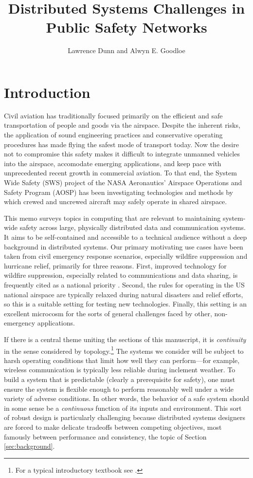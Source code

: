 \documentclass[]             %
{NASA}                       %
\title{Distributed Systems Challenges in Public Safety Networks}
\author{Lawrence Dunn and Alwyn E. Goodloe}
\theoremstyle{definition}
\begin{document}
\newpage
\setcounter{tocdepth}{2}
\tableofcontents
\newpage

\section{Introduction}
\label{introduction}
Civil aviation has traditionally focused primarily on the efficient
and safe transportation of people and goods via the airspace. Despite
the inherent risks, the application of sound engineering practices and
conservative operating procedures has made flying the safest mode of
transport today. Now the desire not to compromise this safety makes it
difficult to integrate unmanned vehicles into the airspace, accomodate
emerging applications, and keep pace with unprecedented recent growth
in commercial aviation. To that end, the System Wide Safety (SWS)
project of the NASA Aeronautics' Airspace Operations and Safety
Program (AOSP) has been investigating technologies and methods by
which crewed and uncrewed aircraft may safely operate in shared
airspace.

This memo surveys topics in computing that are relevant to maintaining
system-wide safety across large, physically distributed data and
communication systems. It aims to be self-contained and accessible to
a technical audience without a deep background in distributed
systems. Our primary motivating use cases have been taken from civil
emergency response scenarios, especially wildfire suppression and
hurricane relief, primarily for three reasons. First, improved
technology for wildfire suppression, especially related to
communications and data sharing, is frequently cited as a national
priority \cite{pcast2023}.  Second, the rules for operating in the US
national airspace are typically relaxed during natural disasters and
relief efforts, so this is a suitable setting for testing new
technologies. Finally, this setting is an excellent microcosm for the
sorts of general challenges faced by other, non-emergency
applications.

If there is a central theme uniting the sections of this manuscript,
it is \emph{continuity} in the sense considered by
topology.\footnote{For a typical introductory textbook see
  \cite{mendelson2012introduction}.} The systems we consider will be
subject to harsh operating conditions that limit how well they can
perform---for example, wireless communication is typically less
reliable during inclement weather. To build a system that is
predictable (clearly a prerequisite for safety), one must ensure the
system is flexible enough to perform reasonably well under a wide
variety of adverse conditions. In other words, the behavior of a safe
system should in some sense be a \emph{continuous} function of its
inputs and environment. This sort of robust design is particularly
challenging because distributed systems designers are forced to make
delicate tradeoffs between competing objectives, most famously between
performance and consistency, the topic of Section
\ref{sec:background}.
\end{document}
